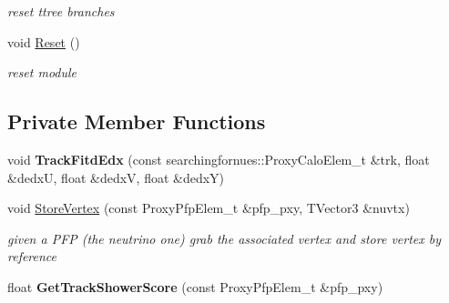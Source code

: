 \begin{DoxyCompactItemize}
\begin{DoxyCompactList}\small\item\em reset ttree branches \end{DoxyCompactList}\item 
void \hyperlink{classselection_1_1ShowerSelection_aa790f42dca70058f567f15e130627011}{Reset} ()\hypertarget{classselection_1_1ShowerSelection_aa790f42dca70058f567f15e130627011}{}\label{classselection_1_1ShowerSelection_aa790f42dca70058f567f15e130627011}

\begin{DoxyCompactList}\small\item\em reset module \end{DoxyCompactList}\end{DoxyCompactItemize}
\subsection*{Private Member Functions}
\begin{DoxyCompactItemize}
\item 
void {\bfseries Track\+Fitd\+Edx} (const searchingfornues\+::\+Proxy\+Calo\+Elem\+\_\+t \&trk, float \&dedxU, float \&dedxV, float \&dedxY)\hypertarget{classselection_1_1ShowerSelection_a9cf0d6d41063cb9137db9d37500be7dd}{}\label{classselection_1_1ShowerSelection_a9cf0d6d41063cb9137db9d37500be7dd}

\item 
void \hyperlink{classselection_1_1ShowerSelection_a9f007d4be7a578b6d07db9172ad4ab14}{Store\+Vertex} (const Proxy\+Pfp\+Elem\+\_\+t \&pfp\+\_\+pxy, T\+Vector3 \&nuvtx)\hypertarget{classselection_1_1ShowerSelection_a9f007d4be7a578b6d07db9172ad4ab14}{}\label{classselection_1_1ShowerSelection_a9f007d4be7a578b6d07db9172ad4ab14}

\begin{DoxyCompactList}\small\item\em given a P\+FP (the neutrino one) grab the associated vertex and store vertex by reference \end{DoxyCompactList}\item 
float {\bfseries Get\+Track\+Shower\+Score} (const Proxy\+Pfp\+Elem\+\_\+t \&pfp\+\_\+pxy)\hypertarget{classselection_1_1ShowerSelection_aa4c7b1935b0705093c8be5065a2d25ed}{}\label{classselection_1_1ShowerSelection_aa4c7b1935b0705093c8be5065a2d25ed}

\end{DoxyCompactItemize}
